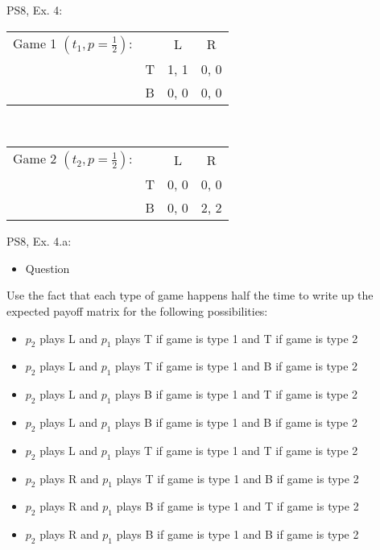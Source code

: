 \begin{frame}{PS8, Ex. 4: }
    \begin{table}
      \begin{tabular}{ll|c|c|}
        \multicolumn{1}{c}{Game 1 $\left(t_1, p=\frac{1}{2}\right)$:} & \multicolumn{1}{c}{} & \multicolumn{1}{c}{L} & \multicolumn{1}{c}{R} \\\cline{3-4}
        & T & 1, 1 & 0, 0 \\\cline{3-4}
        & B & 0, 0 & 0, 0 \\\cline{3-4}
      \end{tabular}
      \\
      \begin{tabular}{ll|c|c|}
        \multicolumn{1}{c}{Game 2 $\left(t_2, p=\frac{1}{2}\right)$:} & \multicolumn{1}{c}{} & \multicolumn{1}{c}{L} & \multicolumn{1}{c}{R} \\\cline{3-4}
        & T & 0, 0 & 0, 0 \\\cline{3-4}
        & B & 0, 0 & 2, 2 \\\cline{3-4}
      \end{tabular}
    \end{table}
    \vfill\null
\end{frame}

\begin{frame}{PS8, Ex. 4.a: }
\begin{itemize}
    \item[a] Question
\end{itemize}
Use the fact that each type of game happens half the time to write up the expected payoff matrix for the following possibilities:
\begin{itemize}
    \item $p_2$ plays L and $p_1$ plays T if game is type 1 and T if game is type 2
    \item $p_2$ plays L and $p_1$ plays T if game is type 1 and B if game is type 2
    \item $p_2$ plays L and $p_1$ plays B if game is type 1 and T if game is type 2
    \item $p_2$ plays L and $p_1$ plays B if game is type 1 and B if game is type 2
    \item $p_2$ plays L and $p_1$ plays T if game is type 1 and T if game is type 2
    \item $p_2$ plays R and $p_1$ plays T if game is type 1 and B if game is type 2
    \item $p_2$ plays R and $p_1$ plays B if game is type 1 and T if game is type 2
    \item $p_2$ plays R and $p_1$ plays B if game is type 1 and B if game is type 2
\end{itemize}
    \vfill\null\null
\end{frame}

